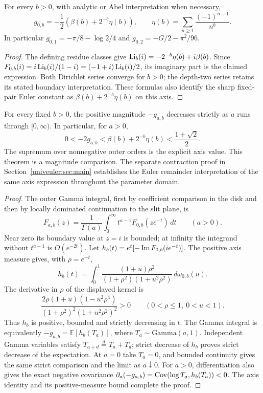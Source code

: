 \begin{corollary}
\label{subpick:cor:axis}
For every $b>0$, with analytic or Abel interpretation when necessary,
\[
 g_{0,b}=-\frac12\left(\beta(b)+2^{-b}\eta(b)\right),
 \qquad \eta(b)=\sum_{n\ge1}\frac{(-1)^{n-1}}{n^b}.
\]
In particular $g_{0,1}=-\pi/8-\log2/4$ and
$g_{0,2}=-G/2-\pi^2/96$.
\end{corollary}
\begin{proof}
The defining residue classes give
$\operatorname{Li}_b(i)=-2^{-b}\eta(b)+i\beta(b)$. Since
$F_{0,b}(i)=i\operatorname{Li}_b(i)/(1-i)=(-1+i)\operatorname{Li}_b(i)/2$,
its imaginary part is the claimed expression. Both Dirichlet series
converge for $b>0$; the depth-two series retains its stated boundary
interpretation. These formulas also identify the sharp fixed-pair
Euler constant as $\beta(b)+2^{-b}\eta(b)$ on this axis.
\end{proof}

\begin{theorem}
\label{subpick:thm:Gaussian-order}
For every fixed $b>0$, the positive magnitude $-g_{a,b}$ decreases
strictly as $a$ runs through $[0,\infty)$. In particular, for $a>0$,
\[
 0<-2g_{a,b}<\beta(b)+2^{-b}\eta(b)<\frac{1+\sqrt2}{2}.
\]
The supremum over nonnegative outer orders is the explicit axis value.
This theorem is a magnitude comparison. The separate contraction proof
in Section~\ref{univeuler:sec:main} establishes the Euler remainder
interpretation of the same axis expression throughout the parameter domain.
\end{theorem}
\begin{proof}
The outer Gamma integral, first by coefficient comparison in the disk
and then by locally dominated continuation to the slit plane, is
\[
 F_{a,b}(z)=\frac1{\Gamma(a)}\int_0^\infty
                      t^{a-1}F_{0,b}(ze^{-t})\,dt\qquad(a>0).
\]
Near zero its boundary value at $z=i$ is bounded; at infinity the
integrand without $t^{a-1}$ is $O(e^{-2t})$. Let
$h_b(t)=e^t[-\operatorname{Im} F_{0,b}(ie^{-t})]$. The positive axis measure gives,
with $\rho=e^{-t}$,
\[
 h_b(t)=\int_0^1
  \frac{(1+u)\rho^2}{(1+\rho^2)(1+u^2\rho^2)}\,d\omega_{0,b}(u).
\]
The derivative in $\rho$ of the displayed kernel is
\[
 \frac{2\rho(1+u)(1-u^2\rho^4)}
 {(1+\rho^2)^2(1+u^2\rho^2)^2}>0\qquad(0<\rho\le1,\ 0<u<1).
\]
Thus $h_b$ is positive, bounded and strictly decreasing in $t$.
The Gamma integral is equivalently
$-g_{a,b}=\mathbb E[h_b(T_a)]$, where $T_a\sim\mathrm{Gamma}(a,1)$.
Independent Gamma variables satisfy $T_{a+d}\overset{d}=T_a+T_d$;
strict decrease of $h_b$ proves strict decrease of the expectation.
At $a=0$ take $T_0=0$, and bounded continuity gives the same strict
comparison and the limit as $a\downarrow0$.
For $a>0$, differentiation also gives the exact negative covariance
$\partial_a(-g_{a,b})=\operatorname{Cov}(\log T_a,h_b(T_a))<0$.
The axis identity and its positive-measure bound complete the proof.
\end{proof}

